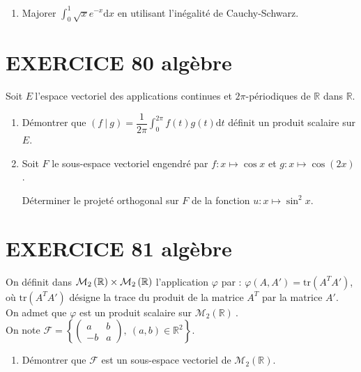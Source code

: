 \documentclass[10pt,oneside]{article}
\begin{document}
\begin{flushleft}
\begin{enumerate}
\item Majorer $\displaystyle\int_{0}^{1}\sqrt{x}e^{-x}\text{d}x$ en utilisant l'in\'{e}galit\'{e} de Cauchy-Schwarz.
\end{enumerate}


\section*{EXERCICE 80 \: algèbre}

Soit $E\ $l'espace vectoriel des applications continues et $2\pi $-p\'{e}riodiques de $\mathbb{R}$ dans $\mathbb{R}$.

\begin{enumerate}
\item Démontrer que $\left( f\ |\ g\right) =\dfrac{1}{2\pi }\displaystyle\int_{0}^{2\pi }f\left( t\right) g\left( t\right) \text{d}t$ d\'{e}finit un produit scalaire sur $E$.

\item Soit $F$ le sous-espace vectoriel engendr\'{e} par $f:x\mapsto \cos x$ et $g:x\mapsto \cos \left( 2x\right)$.\bigskip

D\'{e}terminer le projet\'{e} orthogonal sur $F$ de la fonction $u:x\mapsto \sin ^{2}x$.
\end{enumerate}


\section*{EXERCICE 81 \: algèbre}

On d\'{e}finit dans $\mathcal{M}_{2}\left( \mathbb{R}\right) \times \mathcal{%
M}_{2}\left( \mathbb{R}\right) \ $l'application $\varphi$ par : $\varphi \left( A,A'\right)
=\text{tr}\left( A^TA'\right)$, où $\text{tr}\left( A^TA'\right)$ désigne la trace du produit de la matrice $A^T$ par la matrice $A'$.\\ 
On admet que $\varphi $ est un produit scalaire sur $\mathcal{M}_{2}\left( 
\mathbb{R}\right)\ .$\\
\medskip
On note $\mathcal{F}=\left\{ \left( 
\begin{array}{cc}
a & b \\ 
-b & a%
\end{array}%
\right),\ \left( a,b\right) \in \mathbb{R}^{2}\right\}$.\\

\begin{enumerate}
\item Démontrer que $\mathcal{F}$ est un sous-espace vectoriel de $\mathcal{M}_{2}\left( \mathbb{R}\right) $.


\end{enumerate}
\end{flushleft}
\end{document}
